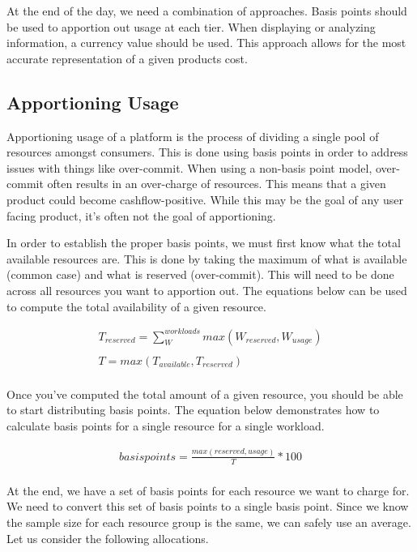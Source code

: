 \documentclass[10pt, a4paper, twocolumn]{article}
\begin{document}
  At the end of the day, we need a combination of approaches.
  Basis points should be used to apportion out usage at each tier.
  When displaying or analyzing information, a currency value should be used.
  This approach allows for the most accurate representation of a given products cost.

  \subsection*{Apportioning Usage}
    Apportioning usage of a platform is the process of dividing a single pool of resources amongst consumers.
    This is done using basis points in order to address issues with things like over-commit.
    When using a non-basis point model, over-commit often results in an over-charge of resources.
    This means that a given product could become cashflow-positive.
    While this may be the goal of any user facing product, it's often not the goal of apportioning.

    In order to establish the proper basis points, we must first know what the total available resources are.
    This is done by taking the maximum of what is available (common case) and what is reserved (over-commit).
    This will need to be done across all resources you want to apportion out.
    The equations below can be used to compute the total availability of a given resource.

    \begin{gather*}
      T_{reserved} = \sum^{workloads}_{W} max(W_{reserved}, W_{usage}) \\
      \\
      T = max(T_{available}, T_{reserved}) \\
    \end{gather*}

    Once you've computed the total amount of a given resource, you should be able to start distributing basis points.
    The equation below demonstrates how to calculate basis points for a single resource for a single workload.

    \begin{gather*}
      basispoints = \frac{max(reserved, usage)}{T} * 100 \\
    \end{gather*}

    At the end, we have a set of basis points for each resource we want to charge for.
    We need to convert this set of basis points to a single basis point.
    Since we know the sample size for each resource group is the same, we can safely use an average.
    Let us consider the following allocations.
\end{document}
